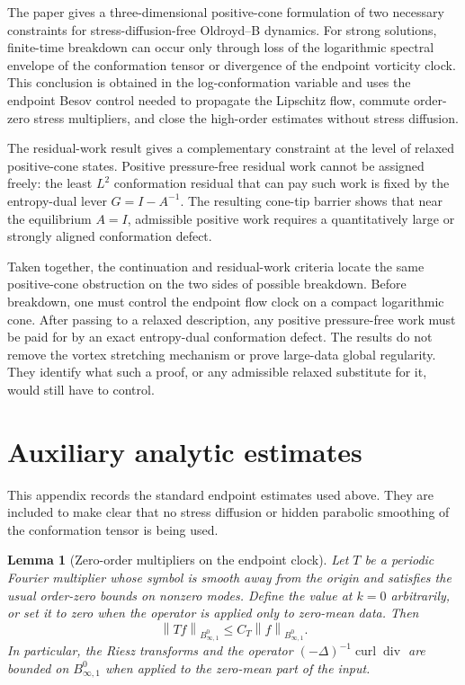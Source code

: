 \documentclass[10pt,a4paper]{amsart}
\numberwithin{equation}{section}
\newtheorem{lemma}[theorem]{Lemma}
\newcommand{\Id}{I}
\newcommand{\divv}{\operatorname{div}}
\newcommand{\curl}{\operatorname{curl}}
\newcommand{\norm}[1]{\left\lVert #1\right\rVert}
\begin{document}
The paper gives a three-dimensional positive-cone formulation of two necessary
constraints for stress-diffusion-free Oldroyd--B dynamics.  For strong
solutions, finite-time breakdown can occur only through loss of the logarithmic
spectral envelope of the conformation tensor or divergence of the endpoint
vorticity clock.  This conclusion is obtained in the log-conformation variable
and uses the endpoint Besov control needed to propagate the Lipschitz flow,
commute order-zero stress multipliers, and close the high-order estimates
without stress diffusion.

The residual-work result gives a complementary constraint at the level of
relaxed positive-cone states.  Positive pressure-free residual work cannot be
assigned freely: the least \(L^2\) conformation residual that can pay such work
is fixed by the entropy-dual lever \(G=\Id-A^{-1}\).  The resulting cone-tip
barrier shows that near the equilibrium \(A=\Id\), admissible positive work
requires a quantitatively large or strongly aligned conformation defect.

Taken together, the continuation and residual-work criteria locate the same
positive-cone obstruction on the two sides of possible breakdown.  Before
breakdown, one must control the endpoint flow clock on a compact logarithmic
cone.  After passing to a relaxed description, any positive pressure-free work
must be paid for by an exact entropy-dual conformation defect.  The results do
not remove the vortex stretching mechanism or prove large-data global
regularity.  They identify what such a proof, or any admissible relaxed
substitute for it, would still have to control.

\appendix

\section{Auxiliary analytic estimates}
\label{app:aux}

This appendix records the standard endpoint estimates used above.  They are
included to make clear that no stress diffusion or hidden parabolic smoothing
of the conformation tensor is being used.

\begin{lemma}[Zero-order multipliers on the endpoint clock]
\label{lem:appendix-multiplier}
Let \(T\) be a periodic Fourier multiplier whose symbol is smooth away from
the origin and satisfies the usual order-zero bounds on nonzero modes.  Define
the value at \(k=0\) arbitrarily, or set it to zero when the operator is
applied only to zero-mean data.  Then
\[
  \norm{Tf}_{B^0_{\infty,1}}
  \le C_T\norm{f}_{B^0_{\infty,1}} .
\]
In particular, the Riesz transforms and the operator
\((-\Delta)^{-1}\curl\divv\) are bounded on \(B^0_{\infty,1}\) when applied
to the zero-mean part of the input.
\end{lemma}
\end{document}
